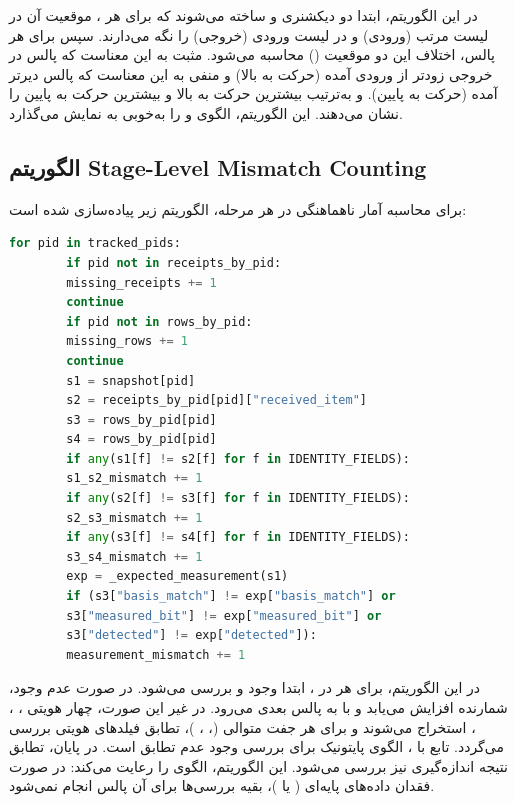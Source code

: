 در این الگوریتم، ابتدا دو دیکشنری  و  ساخته می‌شوند که برای هر ، موقعیت آن در لیست مرتب (ورودی) و در لیست ورودی (خروجی) را نگه می‌دارند. سپس برای هر پالس، اختلاف این دو موقعیت () محاسبه می‌شود.  مثبت به این معناست که پالس در خروجی زودتر از ورودی آمده (حرکت به بالا) و  منفی به این معناست که پالس دیرتر آمده (حرکت به پایین).  و  به‌ترتیب بیشترین حرکت به بالا و بیشترین حرکت به پایین را نشان می‌دهند. این الگوریتم، الگوی  و  را به‌خوبی به نمایش می‌گذارد.

\subsection{الگوریتم Stage-Level Mismatch Counting}

برای محاسبه آمار ناهماهنگی در هر مرحله، الگوریتم زیر پیاده‌سازی شده است:

\begin{LTR}
	\begin{lstlisting}[language=Python]
		for pid in tracked_pids:
		if pid not in receipts_by_pid:
		missing_receipts += 1
		continue
		if pid not in rows_by_pid:
		missing_rows += 1
		continue
		s1 = snapshot[pid]
		s2 = receipts_by_pid[pid]["received_item"]
		s3 = rows_by_pid[pid]
		s4 = rows_by_pid[pid]
		if any(s1[f] != s2[f] for f in IDENTITY_FIELDS):
		s1_s2_mismatch += 1
		if any(s2[f] != s3[f] for f in IDENTITY_FIELDS):
		s2_s3_mismatch += 1
		if any(s3[f] != s4[f] for f in IDENTITY_FIELDS):
		s3_s4_mismatch += 1
		exp = _expected_measurement(s1)
		if (s3["basis_match"] != exp["basis_match"] or
		s3["measured_bit"] != exp["measured_bit"] or
		s3["detected"] != exp["detected"]):
		measurement_mismatch += 1
	\end{lstlisting}
\end{LTR}

در این الگوریتم، برای هر  در ، ابتدا وجود  و  بررسی می‌شود. در صورت عدم وجود، شمارنده  افزایش می‌یابد و با  به پالس بعدی می‌رود. در غیر این صورت، چهار  هویتی ، ، ،  استخراج می‌شوند و برای هر جفت متوالی (، ، )، تطابق فیلدهای هویتی بررسی می‌گردد. تابع  با ، الگوی پایتونیک برای بررسی وجود عدم تطابق است. در پایان، تطابق نتیجه اندازه‌گیری نیز بررسی می‌شود. این الگوریتم، الگوی  را رعایت می‌کند: در صورت فقدان داده‌های پایه‌ای ( یا )، بقیه بررسی‌ها برای آن پالس انجام نمی‌شود.

